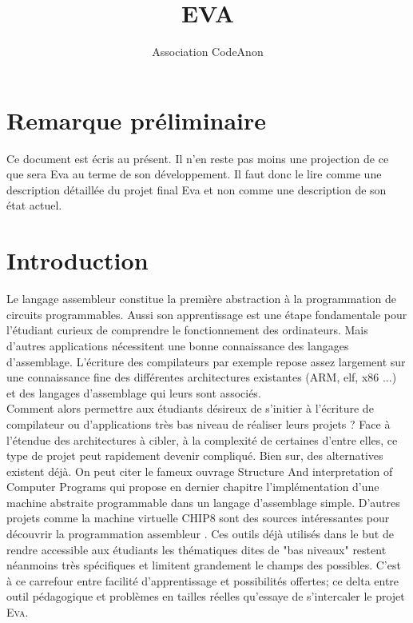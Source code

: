 \documentclass[11pt,twoside,french]{article}
\newcommand{\noun}[1]{\textsc{#1}}
\begin{document}
\title{EVA}
\author{Association CodeAnon}

\maketitle
\clearpage{}

\section*{Remarque préliminaire}

Ce document est écris au présent. Il n'en reste pas moins une projection de ce que sera Eva au terme de son développement. Il faut donc le lire comme une description détaillée du projet final Eva et non comme une description de son état actuel.

\cleardoublepage

\tableofcontents
\cleardoublepage

\vfill

\section{Introduction}

Le langage assembleur constitue la première abstraction à la programmation
de circuits programmables. Aussi son apprentissage est une étape fondamentale pour l'étudiant curieux de comprendre le fonctionnement des ordinateurs. Mais d'autres applications nécessitent une bonne connaissance des langages d'assemblage. L'écriture des compilateurs par exemple repose assez largement sur une connaissance fine des différentes architectures existantes (ARM, elf, x86 ...) et des langages d'assemblage qui leurs sont associés. \\

Comment alors permettre aux étudiants désireux de s'initier à l'écriture de compilateur ou d'applications très bas niveau de réaliser leurs projets ? Face à l'étendue des architectures à cibler, à la complexité de certaines d’entre elles, ce type de projet peut rapidement devenir compliqué. Bien sur, des alternatives existent déjà. On peut citer le fameux ouvrage Structure And interpretation of Computer Programs \cite{SICP} qui propose en dernier chapitre l'implémentation d'une machine abstraite programmable dans un langage d'assemblage simple. D'autres projets comme la machine virtuelle CHIP8 sont des sources intéressantes pour découvrir la programmation assembleur \cite{CHIP8}. Ces outils déjà utilisés dans le but de rendre accessible aux étudiants les thématiques dites de "bas niveaux" restent néanmoins très spécifiques et limitent grandement le champs des possibles. C'est à ce carrefour entre facilité d'apprentissage et possibilités offertes; ce delta entre outil pédagogique et problèmes en tailles réelles qu'essaye de s'intercaler le projet \noun{Eva}. \\
\end{document}
